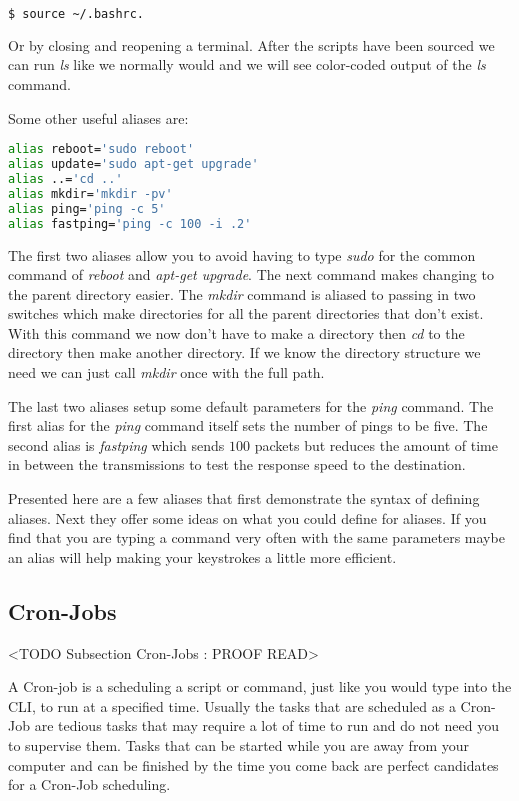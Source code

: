 \begin{lstlisting}[language=bash]
	$ source ~/.bashrc.
\end{lstlisting}

Or by closing and reopening a terminal. After the scripts have been sourced we can run \emph{ls} like we normally would and we will see color-coded output of the \emph{ls} command. 

Some other useful aliases are:

\begin{lstlisting}[language=bash]
alias reboot='sudo reboot'
alias update='sudo apt-get upgrade'
alias ..='cd ..'
alias mkdir='mkdir -pv'
alias ping='ping -c 5'
alias fastping='ping -c 100 -i .2'
\end{lstlisting}
	
The first two aliases allow you to avoid having to type \emph{sudo} for the common command of \emph{reboot} and \emph{apt-get upgrade}. The next command makes changing to the parent directory easier. The \emph{mkdir} command is aliased to passing in two switches which make directories for all the parent directories that don't exist. With this command we now don't have to make a directory then \emph{cd} to the directory then make another directory. If we know the directory structure we need we can just call \emph{mkdir} once with the full path. 

The last two aliases setup some default parameters for the \emph{ping} command. The first alias for the \emph{ping} command itself sets the number of pings to be five. The second alias is \emph{fastping} which sends $100$ packets but reduces the amount of time in between the transmissions to test the response speed to the destination. 

Presented here are a few aliases that first demonstrate the syntax of defining aliases. Next they offer some ideas on what you could define for aliases. If you find that you are typing a command very often with the same parameters maybe an alias will help making your keystrokes a little more efficient. 
	
\subsection{Cron-Jobs}
	<TODO Subsection Cron-Jobs : PROOF READ>

A Cron-job is a scheduling a script or command, just like you would type into the \ac{CLI}, to run at a specified time. Usually the tasks that are scheduled as a Cron-Job are tedious tasks that may require a lot of time to run and do not need you to supervise them. Tasks that can be started while you are away from your computer and can be finished by the time you come back are perfect candidates for  a Cron-Job scheduling. 
	
